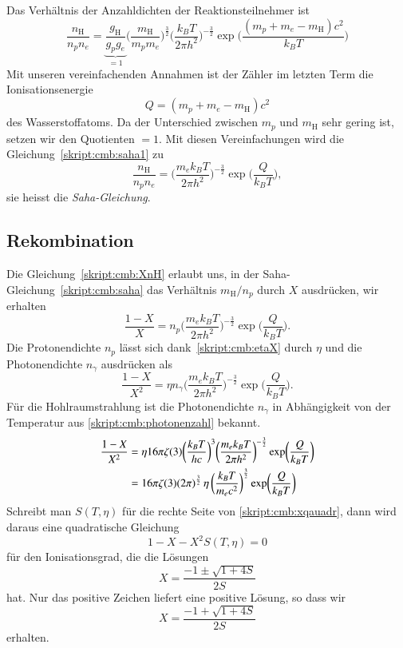 Das Verhältnis der Anzahldichten der Reaktionsteilnehmer ist
\begin{equation}
\frac{n_\text{H}}{n_pn_e}
=
\underbrace{\frac{g_\text{H}}{g_pg_e}}_{\displaystyle=1}
\biggl(\frac{m_\text{H}}{m_pm_e}\biggr)^{\frac32}
\biggl(\frac{k_BT}{2\pi h^2}\biggr)^{-\frac32}
\exp\biggl( \frac{(m_p+m_e-m_\text{H})c^2}{k_BT} \biggr)
\label{skript:cmb:saha1}
\end{equation}
Mit unseren vereinfachenden Annahmen ist der Zähler im letzten Term
die Ionisationsenergie
\[
Q=(m_p+m_e-m_\text{H})c^2
\]
des Wasserstoffatoms.
Da der Unterschied zwischen $m_p$ und $m_\text{H}$ sehr gering ist,
setzen wir den Quotienten $=1$.
Mit diesen Vereinfachungen wird die Gleichung~\eqref{skript:cmb:saha1}
zu
\begin{equation}
\frac{n_\text{H}}{n_pn_e}
=
\biggl(\frac{m_ek_BT}{2\pi h^2}\biggr)^{-\frac32}
\exp\biggl( \frac{Q}{k_BT} \biggr),
\label{skript:cmb:saha}
\end{equation}
sie heisst die {\em Saha-Gleichung}.

\subsection{Rekombination}
Die Gleichung~\eqref{skript:cmb:XnH} erlaubt uns, in der
Saha-Gleichung~\eqref{skript:cmb:saha} das Verhältnis $m_\text{H}/n_p$
durch $X$ ausdrücken, wir erhalten
\begin{equation}
\frac{1-X}{X}
=
n_p
\biggl(\frac{m_ek_BT}{2\pi h^2}\biggr)^{-\frac32}
\exp\biggl( \frac{Q}{k_BT} \biggr).
\end{equation}
Die Protonendichte $n_p$ lässt sich dank~\eqref{skript:cmb:etaX}
durch $\eta$ und die Photonendichte $n_\gamma$ ausdrücken als
\[
\frac{1-X}{X^2}=\eta n_\gamma
\biggl(\frac{m_ek_BT}{2\pi h^2}\biggr)^{-\frac32}
\exp\biggl( \frac{Q}{k_BT} \biggr).
\]
Für die Hohlraumstrahlung ist die Photonendichte $n_\gamma$ in Abhängigkeit
von der Temperatur aus \eqref{skript:cmb:photonenzahl} bekannt.
\begin{align}
\frac{1-X}{X^2}
&=\eta
16\pi\zeta(3)
\biggl(\frac{k_BT}{hc}\biggr)^3
\biggl(\frac{m_ek_BT}{2\pi h^2}\biggr)^{-\frac32}
\exp\biggl( \frac{Q}{k_BT} \biggr)
\notag
\\
&=
16\pi\zeta(3)(2\pi)^{\frac32}
\,
\eta
\,
\biggl(\frac{k_BT}{m_ec^2}\biggr)^{\frac32}
\exp\biggl( \frac{Q}{k_BT} \biggr)
\label{skript:cmb:xqauadr}
\end{align}
Schreibt man $S(T,\eta)$ für die rechte Seite von \eqref{skript:cmb:xqauadr},
dann wird daraus eine quadratische Gleichung
\[
1-X-X^2 S(T,\eta)=0
\]
für den Ionisationsgrad, die die Lösungen
\[
X = \frac{-1\pm\sqrt{1+4S}}{2S}
\]
hat.
Nur das positive Zeichen liefert eine positive Lösung, so dass wir
\[
X=\frac{-1+\sqrt{1+4S}}{2S}
\]
erhalten.


